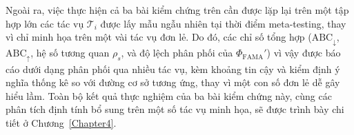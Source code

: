 Ngoài ra, việc thực hiện cả ba bài kiểm chứng trên cần được lặp lại trên một tập hợp lớn các tác vụ $\mathcal{T}_i$ được lấy mẫu ngẫu nhiên tại thời điểm meta-testing, thay vì chỉ minh họa trên một vài tác vụ đơn lẻ. Do đó, các chỉ số tổng hợp ($\mathrm{ABC}_\downarrow$, $\mathrm{ABC}_\uparrow$, hệ số tương quan $\rho_s$, và độ lệch phân phối của $\Phi_{\text{FAMA}}'$) vì vậy được báo cáo dưới dạng phân phối qua nhiều tác vụ, kèm khoảng tin cậy và kiểm định ý nghĩa thống kê so với đường cơ sở tương ứng, thay vì một con số đơn lẻ dễ gây hiểu lầm. Toàn bộ kết quả thực nghiệm của ba bài kiểm chứng này, cùng các phân tích định tính bổ sung trên một số tác vụ minh họa, sẽ được trình bày chi tiết ở Chương~\ref{Chapter4}.

